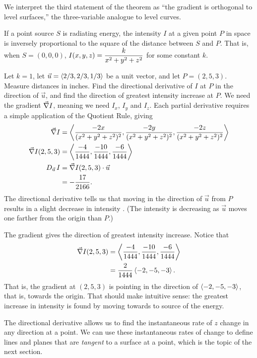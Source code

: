 We interpret the third statement of the theorem as ``the gradient is orthogonal to level surfaces,'' the three-variable analogue to level curves.

\begin{example}\label{ex_direct5}%
If a point source $S$ is radiating energy, the intensity $I$ at a given point $P$ in space is inversely proportional to the square of the distance between $S$ and $P$. That is, when $S=(0,0,0)$,  $\displaystyle I(x,y,z) = \frac{k}{x^2+y^2+z^2}$ for some constant $k$.

Let $k=1$, let $\vec u =\left\langle 2/3, 2/3, 1/3\right\rangle$ be a unit vector, and let $P = (2,5,3).$ Measure distances in inches. Find the directional derivative of $I$ at $P$ in the direction of $\vec u$, and find the direction of greatest intensity increase at $P$.
\solution
We need the gradient $\vec\nabla I$, meaning we need $I_x$, $I_y$ and $I_z$. Each partial derivative requires a simple application of the Quotient Rule, giving
\begin{align*}
\grad I &=\bracket{\frac{-2x}{(x^2+y^2+z^2)^2},\frac{-2y}{(x^2+y^2+z^2)^2},\frac{-2z}{(x^2+y^2+z^2)^2}}\\
\grad I(2,5,3) &=\bracket{\frac{-4}{1444},\frac{-10}{1444},\frac{-6}{1444}}%
\\
D_{\vec u\,}I &= \grad I(2,5,3)\cdot \vec u\\
&= -\frac{17}{2166}%
.
\end{align*}
The directional derivative tells us that moving in the direction of $\vec u$ from $P$ results in a slight decrease in intensity%
. (The intensity is decreasing as $\vec u$ moves one farther from the origin than $P$.)

The gradient gives the direction of greatest intensity increase. Notice that 
\begin{align*}
\vec\nabla I(2,5,3) &=\left\langle \frac{-4}{1444},\frac{-10}{1444},\frac{-6}{1444}\right\rangle\\
			&= \frac{2}{1444}\left\langle -2,-5,-3\right\rangle.
\end{align*}
That is, the gradient at $(2,5,3)$ is pointing in the direction of $\left\langle -2,-5,-3\right\rangle$, that is, towards the origin. That should make intuitive sense: the greatest increase in intensity is found by moving towards to source of the energy.
\end{example}

The directional derivative allows us to find the instantaneous rate of $z$ change in any direction at a point. We can use these instantaneous rates of change to define lines and planes that are \emph{tangent} to a surface at a point, which is the topic of the next section.

